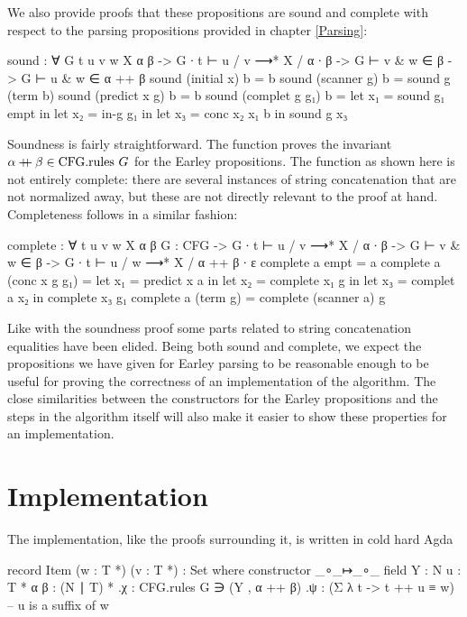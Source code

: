 		\newpage

		We also provide proofs that these propositions are sound and complete
		with respect to the parsing propositions provided in chapter
		\ref{Parsing}:

		\begin{code}
			sound : ∀ {G t u v w X α β} ->
			  G ∙ t ⊢ u / v ⟶* X / α ∙ β ->
			    G ⊢ v & w ∈ β ->
			    G ⊢ u & w ∈ α ++ β
			sound (initial x) b = b
			sound (scanner g) b = sound g (term b)
			sound (predict x g) b = b
			sound (complet g g₁) b =
			  let x₁ = sound g₁ empt in
			  let x₂ = in-g g₁ in
			  let x₃ = conc x₂ x₁ b in
			  sound g x₃
		\end{code}

		Soundness is fairly straightforward. The  function proves
		the invariant $\alpha \mathbin{{+}\mspace{-8mu}{+}} \beta \in \textrm{CFG.rules } G$ for the
		Earley propositions. The function as shown here is not entirely
		complete: there are several instances of string concatenation that
		are not normalized away, but these are not directly relevant to the
		proof at hand. Completeness follows in a similar fashion:

		\begin{code}
			complete : ∀ {t u v w X α β} {G : CFG} ->
			  G ∙ t ⊢ u / v ⟶* X / α ∙ β ->
			  G ⊢ v & w ∈ β ->
			    G ∙ t ⊢ u / w ⟶* X / α ++ β ∙ ε
			complete a empt = a
			complete a (conc x g g₁) =
			  let x₁ = predict x a in
			  let x₂ = complete x₁ g in
			  let x₃ = complet a x₂ in
			  complete x₃ g₁
			complete a (term g) = complete (scanner a) g
		\end{code}

		Like with the soundness proof some parts related to string
		concatenation equalities have been elided. Being both sound and
		complete, we expect the propositions we have given for Earley parsing
		to be reasonable enough to be useful for proving the correctness of an
		implementation of the algorithm. The close similarities between the
		constructors for the Earley propositions and the steps in the algorithm
		itself will also make it easier to show these properties for an
		implementation.

	\section{Implementation}

		The implementation, like the proofs surrounding it, is written in cold
		hard Agda

		\begin{code}
			record Item (w : T *) (v : T *) : Set where
			  constructor _∘_↦_∘_
			  field
			    Y : N
			    u : T *
			    α β : (N ∣ T) *
			    .{χ} : CFG.rules G ∋ (Y , α ++ β)
			    .{ψ} : (Σ λ t -> t ++ u ≡ w)        -- u is a suffix of w
		\end{code}

